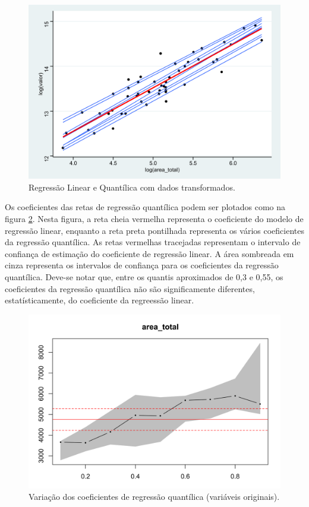 \documentclass[a4paper, 12pt]{article}
\begin{document}
\begin{figure}[H]

{\centering \includegraphics[width=0.7\linewidth]{images/qr2-1} 

}

\caption{Regressão Linear e Quantílica com dados transformados.}\label{fig:qr2}
\end{figure}

Os coeficientes das retas de regressão quantílica podem ser plotados
como na figura \ref{fig:coef1}. Nesta figura, a reta cheia vermelha
representa o coeficiente do modelo de regressão linear, enquanto a reta
preta pontilhada representa os vários coeficientes da regressão
quantílica. As retas vermelhas tracejadas representam o intervalo de
confiança de estimação do coeficiente de regressão linear. A área
sombreada em cinza representa os intervalos de confiança para os
coeficientes da regressão quantílica. Deve-se notar que, entre os
quantis aproximados de 0,3 e 0,55, os coeficientes da regressão
quantílica não são significamente diferentes, estatísticamente, do
coeficiente da regreessão linear.

\begin{figure}[H]

{\centering \includegraphics[width=0.7\linewidth]{images/coef1-1} 

}

\caption{Variação dos coeficientes de regressão quantílica (variáveis originais).}\label{fig:coef1}
\end{figure}
\end{document}
